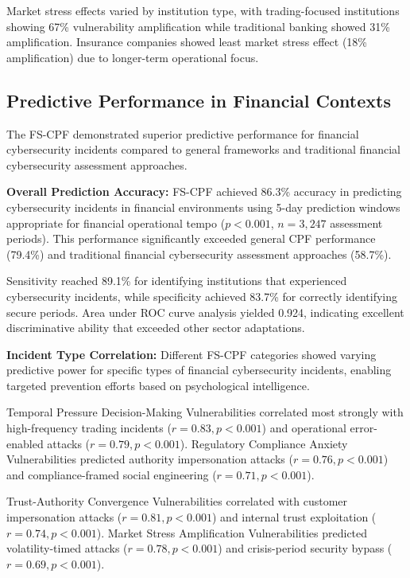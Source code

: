 \documentclass[10pt, twocolumn]{article}
\begin{document}
Market stress effects varied by institution type, with trading-focused institutions showing 67\% vulnerability amplification while traditional banking showed 31\% amplification. Insurance companies showed least market stress effect (18\% amplification) due to longer-term operational focus.

\subsection{Predictive Performance in Financial Contexts}

The FS-CPF demonstrated superior predictive performance for financial cybersecurity incidents compared to general frameworks and traditional financial cybersecurity assessment approaches.

\textbf{Overall Prediction Accuracy:} FS-CPF achieved 86.3\% accuracy in predicting cybersecurity incidents in financial environments using 5-day prediction windows appropriate for financial operational tempo ($p < 0.001$, $n = 3,247$ assessment periods). This performance significantly exceeded general CPF performance (79.4\%) and traditional financial cybersecurity assessment approaches (58.7\%).

Sensitivity reached 89.1\% for identifying institutions that experienced cybersecurity incidents, while specificity achieved 83.7\% for correctly identifying secure periods. Area under ROC curve analysis yielded 0.924, indicating excellent discriminative ability that exceeded other sector adaptations.

\textbf{Incident Type Correlation:} Different FS-CPF categories showed varying predictive power for specific types of financial cybersecurity incidents, enabling targeted prevention efforts based on psychological intelligence.

Temporal Pressure Decision-Making Vulnerabilities correlated most strongly with high-frequency trading incidents ($r = 0.83, p < 0.001$) and operational error-enabled attacks ($r = 0.79, p < 0.001$). Regulatory Compliance Anxiety Vulnerabilities predicted authority impersonation attacks ($r = 0.76, p < 0.001$) and compliance-framed social engineering ($r = 0.71, p < 0.001$).

Trust-Authority Convergence Vulnerabilities correlated with customer impersonation attacks ($r = 0.81, p < 0.001$) and internal trust exploitation ($r = 0.74, p < 0.001$). Market Stress Amplification Vulnerabilities predicted volatility-timed attacks ($r = 0.78, p < 0.001$) and crisis-period security bypass ($r = 0.69, p < 0.001$).
\end{document}
